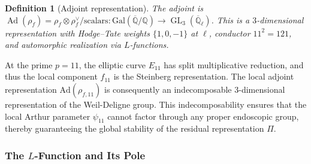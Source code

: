 \documentclass[12pt]{amsart}
\newtheorem{definition}[theorem]{Definition}
\theoremstyle{definition}
\DeclareMathOperator\GL{GL}
\DeclareMathOperator\Ad{Ad}
\newcommand{\Q}{\mathbb{Q}}
\newcommand{\tensor}{\otimes}
\newcommand{\Gal}{\mathrm{Gal}}
\begin{document}
\begin{definition}[Adjoint representation]
The adjoint is $\Ad(\rho_f) = \rho_f \tensor \rho_f^{\vee}/\text{scalars} \colon \Gal(\overline{\Q}/\Q) \to \GL_3(\overline{\Q}_{\ell})$. This is a $3$-dimensional representation with Hodge--Tate weights $\{1, 0, -1\}$ at $\ell$, conductor $11^2 = 121$, and automorphic realization via $L$-functions.
\end{definition}

At the prime $p=11$, the elliptic curve $E_{11}$ has split multiplicative reduction, and thus the local component $f_{11}$ is the Steinberg representation. The local adjoint representation $\text{Ad}(\rho_{f, 11})$ is consequently an indecomposable 3-dimensional representation of the Weil-Deligne group. This indecomposability ensures that the local Arthur parameter $\psi_{11}$ cannot factor through any proper endoscopic group, thereby guaranteeing the global stability of the residual representation $\Pi$.

\subsubsection{The $L$-Function and Its Pole}
\end{document}
